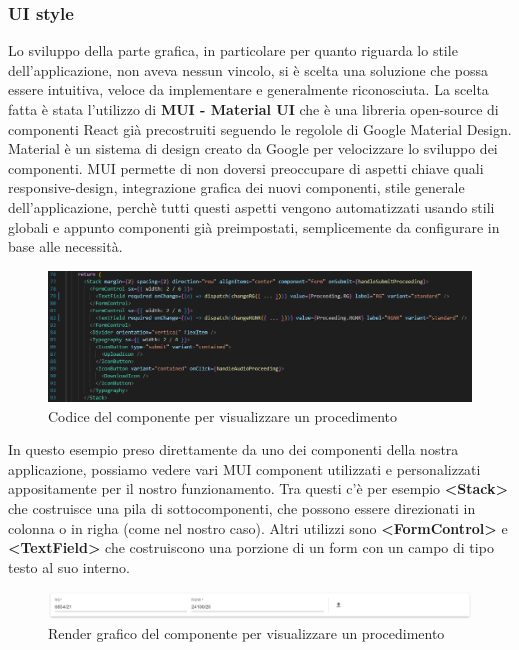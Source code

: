 \subsubsection{UI style}
Lo sviluppo della parte grafica, in particolare per quanto riguarda lo stile dell'applicazione, non aveva nessun vincolo, si è scelta una soluzione che possa essere intuitiva,
veloce da implementare e generalmente riconosciuta. La scelta fatta è stata l'utilizzo di \textbf{MUI - Material UI} che è una libreria open-source di componenti React già precostruiti
seguendo le regolole di Google Material Design. Material è un sistema di design creato da Google per velocizzare lo sviluppo dei componenti. MUI permette di non doversi preoccupare
di aspetti chiave quali responsive-design, integrazione grafica dei nuovi componenti, stile generale dell'applicazione, perchè tutti questi aspetti vengono automatizzati usando
stili globali e appunto componenti già preimpostati, semplicemente da configurare in base alle necessità.

\begin{figure}[H]
  \centering
  \includegraphics[width=\textwidth]{immagini/proceedingCard-MUI.png}
  \caption{Codice del componente per visualizzare un procedimento}
\end{figure}

In questo esempio preso direttamente da uno dei componenti della nostra applicazione, possiamo vedere vari MUI component utilizzati e personalizzati appositamente per il
nostro funzionamento. Tra questi c'è per esempio \textbf{<Stack>} che costruisce una pila di sottocomponenti, che possono essere direzionati in colonna o in righa (come nel nostro caso).
Altri utilizzi sono \textbf{<FormControl>} e \textbf{<TextField>} che costruiscono una porzione di un form con un campo di tipo testo al suo interno.

\begin{figure}[H]
  \centering
  \includegraphics[width=\textwidth]{immagini/proceedingCard-render.png}
  \caption{Render grafico del componente per visualizzare un procedimento}
\end{figure}

